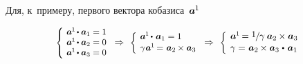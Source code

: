 \begin{otherlanguage}{russian}
Для, к~примеру, первого вектора кобазиса~${\bm{a}^{\hspace{-0.1ex}1}\hspace{-0.1ex}}$

\nopagebreak\vspace{-0.1em}\begin{equation*}
\scalebox{0.9}[0.9]{$\left\{\hspace{-0.16em}\begin{array}{l}
\bm{a}^{\hspace{-0.1ex}1} \hspace{-0.2ex} \dotp \bm{a}_{1} = 1 \\
\bm{a}^{\hspace{-0.1ex}1} \hspace{-0.2ex} \dotp \bm{a}_{2} = 0 \\
\bm{a}^{\hspace{-0.1ex}1} \hspace{-0.2ex} \dotp \bm{a}_{3} = 0 \\[.05em]
\end{array}\right.$}
\Rightarrow\hspace{.33em}
%
\scalebox{0.92}[0.92]{$\left\{\hspace{-0.12em}\begin{array}{l}
\bm{a}^{\hspace{-0.1ex}1} \hspace{-0.2ex} \dotp \hspace{.2ex} \bm{a}_{1} = 1 \\[.1em]
\gamma \hspace{.1ex} \bm{a}^{\hspace{-0.1ex}1} \hspace{-0.2ex} = \hspace{0.1ex} \bm{a}_2 \hspace{-0.1ex} \times \bm{a}_3 \\[.08em]
\end{array}\right.$}
\Rightarrow\hspace{.33em}
%
\scalebox{0.96}[0.96]{$\left\{\hspace{-0.11em}\begin{array}{l}
\bm{a}^{\hspace{-0.1ex}1} \hspace{-0.2ex} =
\displaystyle \nicefrac{\scalebox{0.95}{$1$}\hspace{.1ex}}{\scalebox{1.02}{$\gamma$}} \hspace{.5ex} \bm{a}_2 \hspace{-0.1ex} \times \bm{a}_3 \hspace{0.1ex} \\[.08em]
\gamma = \hspace{0.1ex} \bm{a}_2 \hspace{-0.1ex} \times \bm{a}_3 \hspace{.1ex} \dotp \hspace{.25ex} \bm{a}_{1} \\[.08em]
\end{array}\right.$}
\end{equation*}


\end{otherlanguage}
